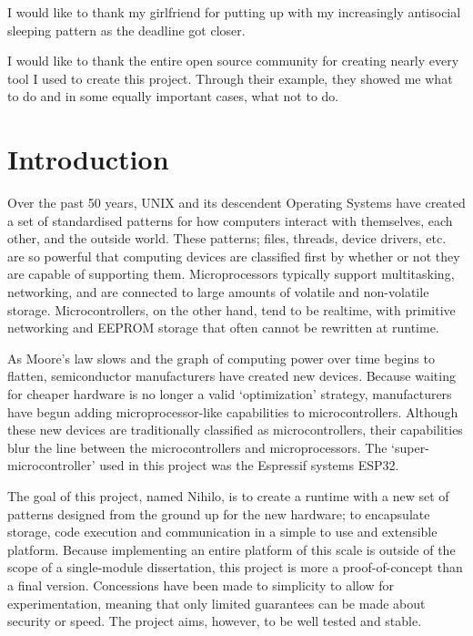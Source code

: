 \documentclass{article}
\begin{document}
I would like to thank my girlfriend for putting up with my increasingly antisocial sleeping pattern as the deadline got closer.

I would like to thank the entire open source community for creating nearly every tool I used to create this project. Through their example, they showed me what to do and in some equally important cases, what not to do.
\pagebreak

\tableofcontents
\listoffigures
\listoftables
\section{Introduction}
Over the past 50 years, UNIX and its descendent Operating Systems have created a set of standardised patterns for how computers interact with themselves, each other, and the outside world.
These patterns; files, threads, device drivers, etc. are so powerful that computing devices are classified first by whether or not they are capable of supporting them.
Microprocessors typically support multitasking, networking, and are connected to large amounts of volatile and non-volatile storage.
Microcontrollers, on the other hand, tend to be realtime, with primitive networking and EEPROM storage that often cannot be rewritten at runtime.

As Moore's law slows and the graph of computing power over time begins to flatten, semiconductor manufacturers have created new devices.
Because waiting for cheaper hardware is no longer a valid \lq optimization' strategy, manufacturers have begun adding microprocessor-like capabilities to microcontrollers.
Although these new devices are traditionally classified as microcontrollers, their capabilities blur the line between the microcontrollers and microprocessors.
The \lq super-microcontroller' used in this project was the Espressif systems ESP32.

The goal of this project, named Nihilo, is to create a runtime with a new set of patterns designed from the ground up for the new hardware; to encapsulate storage, code execution and communication in a simple to use and extensible platform.
Because implementing an entire platform of this scale is outside of the scope of a single-module dissertation, this project is more a proof-of-concept than a final version.
Concessions have been made to simplicity to allow for experimentation, meaning that only limited guarantees can be made about security or speed.
The project aims, however, to be well tested and stable.
\end{document}
